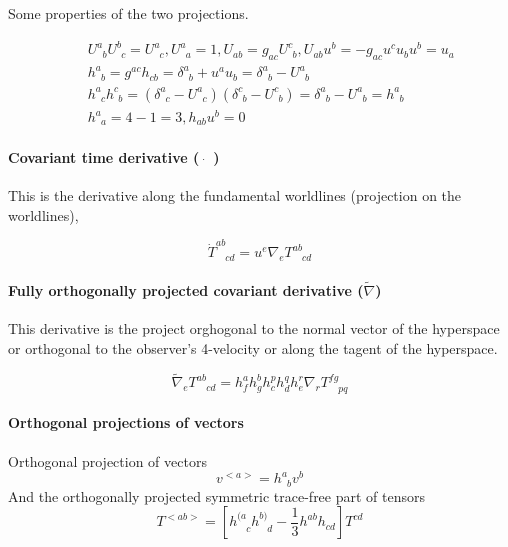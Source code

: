 \documentclass[12pt,a4paper]{book}
\begin{document}
Some properties of the  two projections.

\begin{eqnarray}
&& U^a_{\phantom a b} U^b_{\phantom bc} = U^a_{\phantom a c}  ,  U^a_{\phantom a a} = 1  , U_{ab}=g_{ac} U^c_{\phantom cb}  , U_{ab} u^b = - g_{ac} u^c u_b u^b = u_a \\
&& h^a_{\phantom ab} = g^{ac} h_{cb} = \delta^a_{\phantom ab} + u^a u_b = \delta^a_{\phantom ab} - U^a_{\phantom ab} \\
&& h^a_{\phantom a c}h^c_{\phantom c b} = (\delta^a_{\phantom ac} - U^a_{\phantom ac})(\delta^c_{\phantom cb} - U^c_{\phantom cb}) = \delta^a_{\phantom ab} - U^a_{\phantom ab} = h^a_{\phantom ab} \\
&& h^a_{\phantom aa} = 4-1 = 3  ,   h_{ab}u^b = 0
\end{eqnarray}





\paragraph{Covariant time derivative ($\dot \quad$)} This is the derivative along the fundamental worldlines (projection on the worldlines),

\begin{equation}
\dot T^{ab}_{\phantom{ab}cd} = u^e \nabla_e T^{ab}_{\phantom{ab}cd}
\end{equation}


\paragraph{Fully orthogonally projected covariant derivative ($\tilde \nabla$)}  This derivative is the project orghogonal to the normal vector of the hyperspace or orthogonal to the observer's 4-velocity or along the tagent of the hyperspace.

\begin{equation}
	\tilde\nabla_e T^{ab}_{\phantom{ab}cd} = h^a_f h^b_gh^p_ch^q_dh^r_e \nabla_r T^{fg}_{\phantom{fg}pq}
\end{equation}

\paragraph{Orthogonal projections of vectors}
	Orthogonal projection of vectors
\begin{equation}
v^{<a>}	= h^a_{\phantom a b} v^b
\end{equation}
 And the orthogonally projected symmetric trace-free part of tensors
 \begin{equation}
	T^{<ab>} = [h^{(a}_{\phantom {(a} c} h^{b)}_{\phantom{b)}d} - \frac{1}{3} h^{ab} h_{cd} ] T^{cd}
\end{equation}
\end{document}
